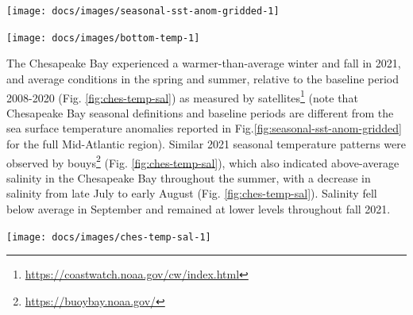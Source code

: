 \documentclass[
  10pt,
]{article}
\let\origfigure\figure
\let\endorigfigure\endfigure
\renewenvironment{figure}[1][2] {
    \expandafter\origfigure\expandafter[H]
} {
    \endorigfigure
}
\begin{document}
\begin{figure}

{\centering \texttt{[image: docs/images/seasonal-sst-anom-gridded-1]} 

}

\caption{MAB (grey outline) seasonal sea surface temperature (SST) time series overlaid onto 2021 seasonal spatial anomalies. Seasons are defined as: Jan-Mar for winter, Apr-Jun for spring, Jul-Sep for summer, and Oct-Dec for fall.}\label{fig:seasonal-sst-anom-gridded}
\end{figure}

\begin{figure}

{\centering \texttt{[image: docs/images/bottom-temp-1]} 

}

\caption{Annual bottom temperature in the MAB (black = in situ observations, red = observations from modeled reanalysis for comparison).}\label{fig:bottom-temp}
\end{figure}

The Chesapeake Bay experienced a warmer-than-average winter and fall in
2021, and average conditions in the spring and summer, relative to the
baseline period 2008-2020 (Fig. \ref{fig:ches-temp-sal}) as measured by
satellites\footnote{\url{https://coastwatch.noaa.gov/cw/index.html}}
(note that Chesapeake Bay seasonal definitions and baseline periods are
different from the sea surface temperature anomalies reported in
Fig.\ref{fig:seasonal-sst-anom-gridded} for the full Mid-Atlantic
region). Similar 2021 seasonal temperature patterns were observed by
bouys\footnote{\url{https://buoybay.noaa.gov/}} (Fig.
\ref{fig:ches-temp-sal}), which also indicated above-average salinity in
the Chesapeake Bay throughout the summer, with a decrease in salinity
from late July to early August (Fig. \ref{fig:ches-temp-sal}). Salinity
fell below average in September and remained at lower levels throughout
fall 2021.

\begin{figure}

{\centering \texttt{[image: docs/images/ches-temp-sal-1]} 

}

\caption{Left panel: 2021 sea surface temperature anomalies for the Chesapeake Bay.  Data are from NOAA’s multi-satellite SST products and produced by NOAA’s Coastwatch Program. Seasons are defined to match the annual life cycles of many biological resources in Chesapeake Bay: Dec-Feb for winter, Mar-May for spring, Jun-Aug for summer, and Sep-Nov for fall. Right panel: NOAA Chesapeake Bay Interpretive Buoy System Gooses Reef bouy sea water temperature (top) and salinity (bottom); Red = 2021, Blue = Long term average 2010-2020.}\label{fig:ches-temp-sal}
\end{figure}
\end{document}
